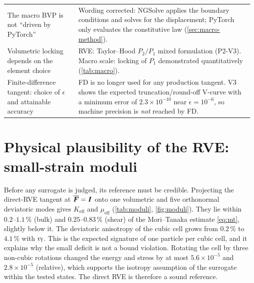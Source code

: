 {\begin{xltabular}{\textwidth}{@{}p{5.0cm}X@{}}
The macro BVP is not ``driven by PyTorch'' &
  Wording corrected: NGSolve applies the boundary conditions and solves for the
  displacement; PyTorch only evaluates the constitutive law (\cref{sec:macro-method}).\\
Volumetric locking depends on the element choice &
  RVE: Taylor--Hood $P_2/P_1$ mixed formulation (P2-V3). Macro scale: locking of
  $P_1$ demonstrated quantitatively (\cref{tab:macro}).\\
Finite-difference tangent: choice of $\epsilon$ and attainable accuracy &
  FD is no longer used for any production tangent. V3 shows the expected
  truncation/round-off V-curve with a minimum error of $2.3\times10^{-10}$ near
  $\epsilon=10^{-6}$, so machine precision is \emph{not} reached by FD.\\
\end{xltabular}
}

\section{Physical plausibility of the RVE: small-strain moduli}

Before any surrogate is judged, its reference must be credible. Projecting the
direct-RVE tangent at $\overline{\bm F}=\bm I$ onto one volumetric and five orthonormal
deviatoric modes gives $K_{\mathrm{eff}}$ and $\mu_{\mathrm{eff}}$
(\cref{tab:moduli}, \cref{fig:moduli}). They lie within $0.2$--$1.1\,\%$ (bulk) and
$0.25$--$0.83\,\%$ (shear) of the Mori--Tanaka estimate \cref{eq:mt}, slightly
below it. The deviatoric anisotropy of the cubic cell grows from $0.2\,\%$ to
$4.1\,\%$ with $v_{\mathrm f}$. This is the expected signature of one particle per cubic
cell, and it explains why the small deficit is not a bound violation. Rotating the
cell by three non-cubic rotations changed the energy and stress by at most
$5.6\times10^{-5}$ and $2.8\times10^{-5}$ (relative), which supports the isotropy
assumption of the surrogate within the tested states. The direct RVE is
therefore a sound reference.

